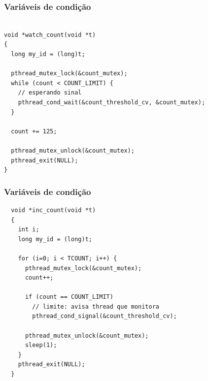 \documentclass[xcolor=dvipsnames,11pt,presentation,aspectratio=169]{beamer}
\begin{document}
\begin{frame}[fragile]
  \frametitle{Variáveis de condição}
\begin{lstlisting}

void *watch_count(void *t) 
{
  long my_id = (long)t;

  pthread_mutex_lock(&count_mutex);
  while (count < COUNT_LIMIT) {
    // esperando sinal
    pthread_cond_wait(&count_threshold_cv, &count_mutex);
  }
  
  count += 125;

  pthread_mutex_unlock(&count_mutex);
  pthread_exit(NULL);
}

\end{lstlisting}
\end{frame}
\begin{frame}[fragile]
  \frametitle{Variáveis de condição}
  \vspace{-5mm}
\begin{lstlisting}
  void *inc_count(void *t) 
  {
    int i;
    long my_id = (long)t;
  
    for (i=0; i < TCOUNT; i++) {
      pthread_mutex_lock(&count_mutex);
      count++;
  
      if (count == COUNT_LIMIT)
        // limite: avisa thread que monitora
        pthread_cond_signal(&count_threshold_cv);

      pthread_mutex_unlock(&count_mutex);
      sleep(1);
    }
    pthread_exit(NULL);
  }
\end{lstlisting}
\end{frame}


\end{document}
